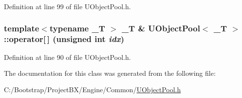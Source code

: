 Definition at line 99 of file UObjectPool.h.\hypertarget{class_u_object_pool_200586a36693e4318c776ce133ce8354}{
\subsubsection[{operator[]}]{\setlength{\rightskip}{0pt plus 5cm}template$<$typename \_\-T $>$ \_\-T \& {\bf UObjectPool}$<$ \_\-T $>$::operator\mbox{[}$\,$\mbox{]} (unsigned int {\em idx})}}
\label{class_u_object_pool_200586a36693e4318c776ce133ce8354}




Definition at line 90 of file UObjectPool.h.

The documentation for this class was generated from the following file:\begin{CompactItemize}
\item 
C:/Bootstrap/ProjectBX/Engine/Common/\hyperlink{_u_object_pool_8h}{UObjectPool.h}\end{CompactItemize}
